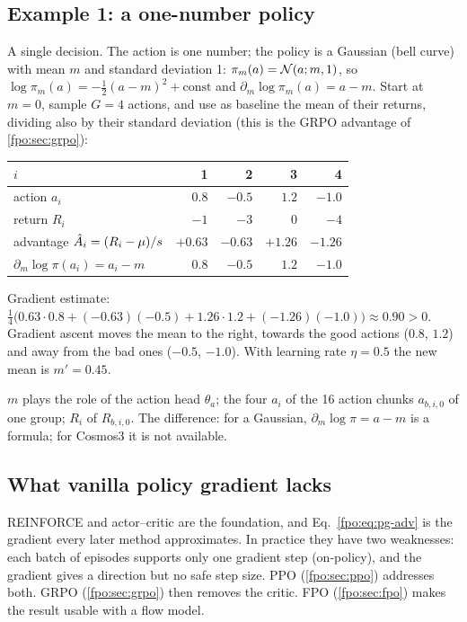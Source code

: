 \subsection{Example 1: a one-number policy}\label{fpo:sec:ex1}
A single decision. The action is one number; the policy is a Gaussian (bell curve) with mean $m$ and standard deviation 1: $\pi_m(a)=\mathcal{N}(a;m,1)$, so $\log\pi_m(a)=-\tfrac12(a-m)^2+\text{const}$ and $\partial_m\log\pi_m(a)=a-m$. Start at $m=0$, sample $G=4$ actions, and use as baseline the mean of their returns, dividing also by their standard deviation (this is the GRPO advantage of \cref{fpo:sec:grpo}):
\begin{center}
\small
\begin{tabular}{@{}lrrrr@{}}
\toprule
$i$ & 1 & 2 & 3 & 4\\
\midrule
action $a_i$ & $0.8$ & $-0.5$ & $1.2$ & $-1.0$\\
return $R_i$ & $-1$ & $-3$ & $0$ & $-4$\\
advantage $\hat A_i=(R_i-\mu)/s$ & $+0.63$ & $-0.63$ & $+1.26$ & $-1.26$\\
$\partial_m\log\pi(a_i)=a_i-m$ & $0.8$ & $-0.5$ & $1.2$ & $-1.0$\\
\bottomrule
\end{tabular}
\end{center}
Gradient estimate: $\tfrac14\big(0.63\cdot0.8+(-0.63)(-0.5)+1.26\cdot1.2+(-1.26)(-1.0)\big)\approx0.90>0$. Gradient ascent moves the mean to the right, towards the good actions ($0.8$, $1.2$) and away from the bad ones ($-0.5$, $-1.0$). With learning rate $\eta=0.5$ the new mean is $m'=0.45$.
\begin{paperlink}
$m$ plays the role of the action head $\theta_a$; the four $a_i$ of the 16 action chunks $a_{b,i,0}$ of one group; $R_i$ of $R_{b,i,0}$. The difference: for a Gaussian, $\partial_m\log\pi=a-m$ is a formula; for Cosmos3 it is not available.
\end{paperlink}

\subsection{What vanilla policy gradient lacks}
REINFORCE and actor--critic are the foundation, and Eq.~\eqref{fpo:eq:pg-adv} is the gradient every later method approximates. In practice they have two weaknesses: each batch of episodes supports only one gradient step (on-policy), and the gradient gives a direction but no safe step size. PPO (\cref{fpo:sec:ppo}) addresses both. GRPO (\cref{fpo:sec:grpo}) then removes the critic. FPO (\cref{fpo:sec:fpo}) makes the result usable with a flow model.

